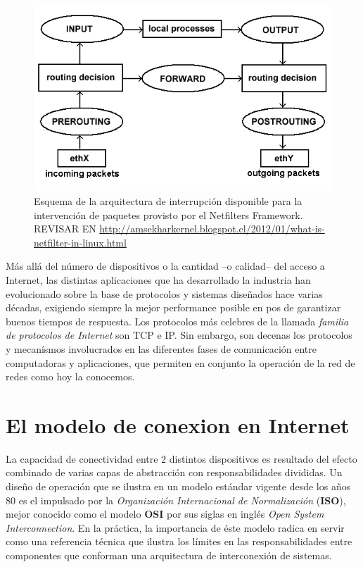 \begin{figure}[!h]
	\centering
	\includegraphics[scale=.5]{imagenes/netfilterArchitecture}
	\caption{Esquema de la arquitectura de interrupción disponible para la intervención de paquetes provisto por el Netfilters Framework. REVISAR EN \url{http://amsekharkernel.blogspot.cl/2012/01/what-is-netfilter-in-linux.html}}
	\label{netfilterArchitecture}
\end{figure}

Más allá del número de dispositivos o la cantidad --o calidad-- del acceso a Internet, las distintas aplicaciones que ha desarrollado la industria han evolucionado sobre la base de protocolos y sistemas diseñados hace varias décadas, exigiendo siempre la mejor performance posible en pos de garantizar buenos tiempos de respuesta. Los protocolos más celebres de la llamada \emph{familia de protocolos de Internet} son TCP e IP. Sin embargo, son decenas los protocolos y mecanísmos involucrados en las diferentes fases de comunicación entre computadoras y aplicaciones, que permiten en conjunto la operación de la red de redes como hoy la conocemos.

\section{El modelo de conexion en Internet}
La capacidad de conectividad entre 2 distintos dispositivos es resultado del efecto combinado de varias capas de abstracción con responsabilidades divididas. Un diseño de operación que se ilustra en un modelo estándar vigente desde los años 80 es el impulsado por la \emph{Organización Internacional de Normalización} (\textbf{ISO}), mejor conocido como el modelo \textbf{OSI} por sus siglas en inglés \emph{Open System Interconnection}. En la práctica, la importancia de éste modelo radica en servir como una referencia técnica que ilustra los límites en las responsabilidades entre componentes que conforman una arquitectura de interconexión de sistemas.

